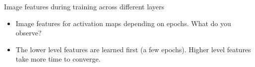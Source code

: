 \documentclass[xcolor=pdftex,dvipsnames,table]{beamer}
\begin{document}
\begin{frame}{Image features during training across different layers}
\begin{figure}[htb]
\end{figure}
\begin{itemize}
	\item <1-> Image features for activation maps depending on epochs. What do you observe?
	\item <2-> The lower level features are learned first (a few epochs). Higher level features take more time to converge.
\end{itemize}
\end{frame}

\end{document}
